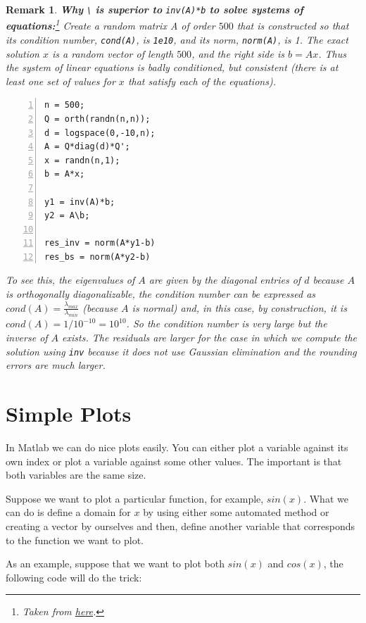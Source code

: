 \documentclass[a4paper,11pt]{article}
\newtheorem{remark}{Remark}
\begin{document}
\begin{remark}

\textbf{Why} \verb+\+ \textbf{is superior to} \verb+inv(A)*b+ \textbf{to solve systems of equations:}\footnote{Taken from \href{es.mathworks.com/help/matlab/ref/inv.html}{here}.} Create a random matrix A of order $500$ that is constructed so that its condition number, \texttt{cond(A)}, is \texttt{1e10}, and its norm, \texttt{norm(A)}, is 1. The exact solution $x$ is a random vector of length $500$, and the right side is $b = Ax$. Thus the system of linear equations is badly conditioned, but consistent (there is at least one set of values for $x$ that satisfy each of the equations). 

\begin{Verbatim}[numbers=left, fontsize = \small]
n = 500; 
Q = orth(randn(n,n));
d = logspace(0,-10,n);
A = Q*diag(d)*Q';
x = randn(n,1);
b = A*x;

y1 = inv(A)*b; 
y2 = A\b;

res_inv = norm(A*y1-b)
res_bs = norm(A*y2-b)
\end{Verbatim}

To see this, the eigenvalues of $A$ are given by the diagonal entries of $d$ because $A$ is orthogonally diagonalizable, the condition number can be expressed as $cond(A) = \frac{\lambda_{max}}{\lambda_{min}}$ (because $A$ is normal) and, in this case, by construction, it is $cond(A) = 1/10^{-10} = 10^{10}$. So the condition number is very large but the inverse of $A$ exists. The residuals are larger for the case in which we compute the solution using \texttt{inv} because it does not use Gaussian elimination and the rounding errors are much larger.
\end{remark}

\section{Simple Plots}

In Matlab we can do nice plots easily. You can either plot a variable against its own index or plot a variable against some other values. The important is that both variables are the same size.

Suppose we want to plot a particular function, for example, $sin(x)$. What we can do is define a domain for $x$ by using either some automated method or creating a vector by ourselves and then, define another variable that corresponds to the function we want to plot.

As an example, suppose that we want to plot both $sin(x)$ and $cos(x)$, the following code will do the trick:
\end{document}

